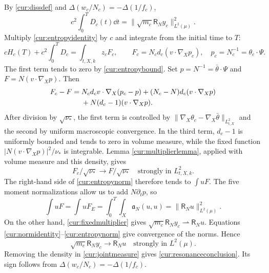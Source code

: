 By \eqref{cur:dissdef} and
$\Delta(w_c/N_c)=-\Delta(1/f_c)$,
\begin{equation}\label{cur:normidentity}
 c^2\int_0^TD_c(t)\dd t
             =\|\sqrt{m_c}\mathsf R_Ny_c\|_{L^2(\mu)}^2.
\end{equation}
Multiply \eqref{cur:entropyidentity} by $c$ and integrate from the
initial time to $T$:
\begin{equation}\label{cur:entropynorm}
 cH_c(T)+c^2\int_0^TD_c
        =\int_{t,X,k}z_cF_c,\qquad
 F_c=N_cd_c(v\cdot\nabla_Xp_c),\quad p_c=N_c^{-1}=\theta_c\cdot\Psi.
\end{equation}
The first term tends to zero by \eqref{cur:entropybound}.
Set $p=N^{-1}=\bar\theta\cdot\Psi$ and $F=N(v\cdot\nabla_Xp)$.
Then
\begin{align}
 F_c-F={}&N_cd_cv\cdot\nabla_X(p_c-p)
       +(N_c-N)d_c(v\cdot\nabla_Xp)\notag\\
       &+N(d_c-1)(v\cdot\nabla_Xp).
       \label{cur:workdifference}
\end{align}
After division by $\sqrt{\nu_*}$, the first term is controlled by
$\|\nabla_X\theta_c-\nabla_X\bar\theta\|_{L^2_{t,X}}$ and the second
by uniform macroscopic convergence. In the third term, $d_c-1$ is
uniformly bounded and tends to zero in volume measure, while the
fixed function $|N(v\cdot\nabla_Xp)|^2/\nu_*$ is integrable.
Lemma \ref{cur:multiplierlemma}, applied with volume measure and this
density, gives
\begin{equation}\label{cur:workstrong}
 F_c/\sqrt{\nu_*}\longrightarrow F/\sqrt{\nu_*}
                  \quad\text{strongly in }L^2_{t,X,k}.
\end{equation}
The right-hand side of \eqref{cur:entropynorm} therefore tends to
$\int uF$. The five moment normalizations allow us to add
$N\partial_tp$, so
\[
 \int uF=\int uF_E
     =\int_0^T\!\int_X\mathfrak a_N(u,u)
     =\|\mathsf R_Nu\|_{L^2(\mu)}^2.
\]
On the other hand, \eqref{cur:fixedmultiplier} gives
$\sqrt{m_c}\mathsf R_Ny_c\rightharpoonup\mathsf R_Nu$.
Equations \eqref{cur:normidentity}--\eqref{cur:entropynorm}
give convergence of the norms. Hence
\begin{equation}\label{cur:strongresonance}
 \sqrt{m_c}\mathsf R_Ny_c\longrightarrow\mathsf R_Nu
                         \quad\text{strongly in }L^2(\mu).
\end{equation}
Removing the density in \eqref{cur:jointmeasure} gives
\eqref{cur:resonanceconclusion}. Its sign follows from
$\Delta(w_c/N_c)=-\Delta(1/f_c)$.

